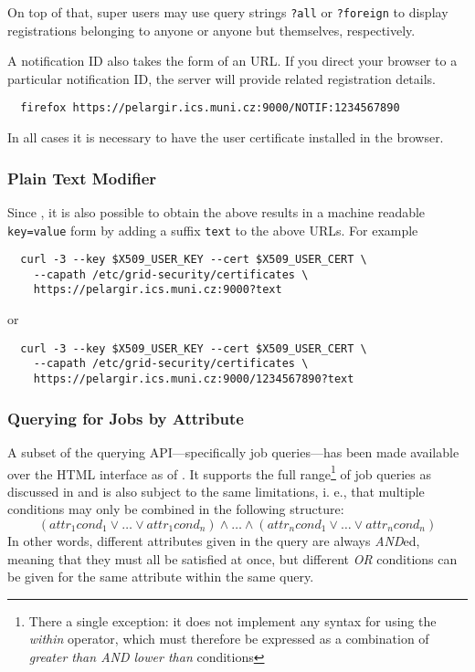 On top of that, \LB super users may use query strings \texttt{?all} or \texttt{?foreign} to display registrations belonging to anyone or anyone but themselves, respectively.

A notification ID also takes the form of an URL. If you direct your browser to a particular notification ID, the \LB server will provide related registration details.
\begin{verbatim}
  firefox https://pelargir.ics.muni.cz:9000/NOTIF:1234567890
\end{verbatim}
In all cases it is necessary to have the user certificate installed in the browser.

\subsubsection{Plain Text Modifier}

Since , it is also possible to obtain the above results in a machine readable 
\verb'key=value' form by adding a suffix \verb'text' to the above URLs. For example
\begin{verbatim}
  curl -3 --key $X509_USER_KEY --cert $X509_USER_CERT \
    --capath /etc/grid-security/certificates \ 
    https://pelargir.ics.muni.cz:9000?text
\end{verbatim}
or
\begin{verbatim}
  curl -3 --key $X509_USER_KEY --cert $X509_USER_CERT \
    --capath /etc/grid-security/certificates \ 
    https://pelargir.ics.muni.cz:9000/1234567890?text
\end{verbatim}

\subsubsection{Querying for Jobs by Attribute}
\label{HTML:queries}

A subset of the \LB querying API---specifically job queries---has been made available over the HTML interface as of . It supports the full range\footnote{There a single exception: it does not implement any syntax for using the \emph{within} operator, which must therefore be expressed as a combination of \emph{greater than AND lower than} conditions} of job queries as discussed in \cite{lbdg} and is also subject to the same limitations, i. e., that multiple conditions may only be combined in the following structure:
$$(attr_{1}cond_{1} \vee \dots \vee attr_{1}cond_{n}) \wedge \dots \wedge (attr_{n}cond_{1} \vee \dots \vee attr_{n}cond_{n})$$
In other words, different attributes given in the query are always \emph{AND}ed, meaning that they must all be satisfied at once, but different \emph{OR} conditions can be given for the same attribute within the same query.

